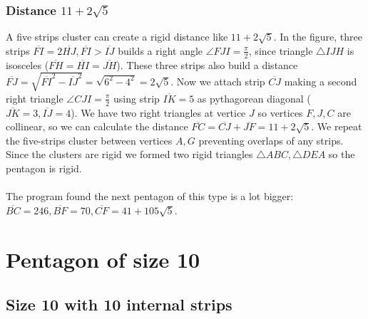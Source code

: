 \documentclass[11pt]{article}
\begin{document}
\subsubsection{Distance $11+2\sqrt{5}$}

A five strips cluster can create a rigid distance like $11 + 2\sqrt{5}$. In the figure, three strips $\overline{FI} = 2\overline{HJ}, \overline{FI} > \overline{IJ}$ builds a right angle $\angle{FJI} = \frac{\pi}2$, since triangle $\triangle{IJH}$ is isosceles ($\overline{FH} = \overline{HI} = \overline{JH}$). These three strips also build a distance $\overline{FJ} = \sqrt{\overline{FI}^2 - \overline{IJ}^2} = \sqrt{6^2 - 4^2} = 2\sqrt5$. Now we attach strip $\overline{CJ}$ making a second right triangle $\angle{CJI} = \frac{\pi}2$ using strip $\overline{IK}=5$ as pythagorean diagonal ($\overline{JK}=3, \overline{IJ}=4$). We have two right triangles at vertice $J$ so vertices $F,J,C$ are collinear, so we can calculate the distance $\overline{FC} = \overline{CJ} + \overline{JF} = 11 + 2\sqrt5$. We repeat the five-strips cluster between vertices $A,G$ preventing overlaps of any strips. Since the clusters are rigid we formed two rigid triangles $\triangle{ABC}, \triangle{DEA}$ so the pentagon is rigid.
\\\\
The program found the next pentagon of this type is a lot bigger: $\overline{BC}=246, \overline{BF}=70, \overline{CF}=41+105\sqrt5$.

\section{Pentagon of size 10}

\subsection{Size 10 with 10 internal strips}
\end{document}
